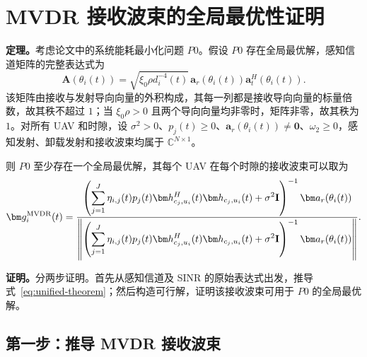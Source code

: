 \section{MVDR 接收波束的全局最优性证明}

\noindent\textbf{定理。}考虑论文中的系统能耗最小化问题 $P0$。假设 $P0$ 存在全局最优解，感知信道矩阵的完整表达式为
\begin{equation}\label{eq:theorem-channel}
\mathbf A(\theta_i(t))=\sqrt{\xi_0\rho d_i^{-4}(t)}\,
\bm a_r(\theta_i(t))\bm a_t^H(\theta_i(t)).
\end{equation}
该矩阵由接收与发射导向向量的外积构成，其每一列都是接收导向向量的标量倍数，故其秩不超过 $1$；当 $\xi_0\rho>0$ 且两个导向向量均非零时，矩阵非零，故其秩为 $1$。对所有 UAV 和时隙，设 $\sigma^2>0$、$p_j(t)\ge0$、$\bm a_r(\theta_i(t))\ne\bm0$、$\omega_2\ge0$，感知发射、卸载发射和接收波束均属于 $\mathbb C^{N\times1}$。

则 $P0$ 至少存在一个全局最优解，其每个 UAV 在每个时隙的接收波束可以取为
\begin{equation}\label{eq:unified-theorem}
\bm g_i^{\rm MVDR}(t)=
\frac{\left(\displaystyle\sum_{j=1}^J\eta_{i,j}(t)p_j(t)
\bm h_{c_j,u_i}^{H}(t)\bm h_{c_j,u_i}(t)+\sigma^2\mathbf I\right)^{-1}
\bm a_r(\theta_i(t))}
{\left\|\left(\displaystyle\sum_{j=1}^J\eta_{i,j}(t)p_j(t)
\bm h_{c_j,u_i}^{H}(t)\bm h_{c_j,u_i}(t)+\sigma^2\mathbf I\right)^{-1}
\bm a_r(\theta_i(t))\right\|}.
\end{equation}

\medskip
\noindent\textbf{证明。}分两步证明。首先从感知信道及 SINR 的原始表达式出发，推导式~\eqref{eq:unified-theorem}；然后构造可行解，证明该接收波束可用于 $P0$ 的全局最优解。

\subsection{第一步：推导 MVDR 接收波束}

